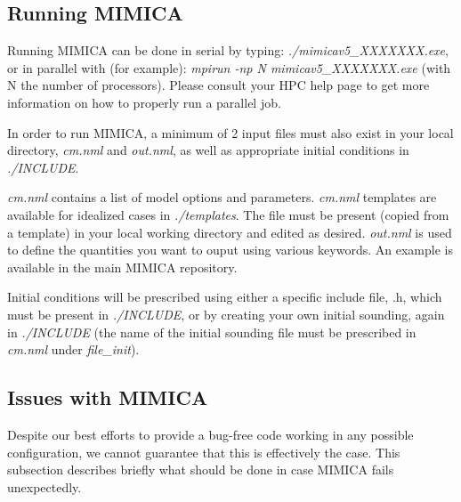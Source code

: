 \documentclass[12pt,A4,french]{article}
\begin{document}
 \subsection{Running MIMICA}

Running MIMICA can be done in serial by typing: {\it ./mimicav5\_XXXXXXX.exe}, or in parallel with (for example): {\it mpirun -np N mimicav5\_XXXXXXX.exe} (with N the number of processors). Please consult your HPC help page to get more information on how to properly run a parallel job.

In order to run MIMICA, a minimum of 2 input files must also exist in your local directory, {\it cm.nml} and {\it out.nml}, as well as appropriate initial conditions in {\it ./INCLUDE}.

{\it cm.nml} contains a list of model options and parameters. {\it cm.nml} templates are available for idealized cases in {\it ./templates}. The file must be present (copied from a template) in your local working directory and edited as desired. {\it out.nml} is used to define the quantities you want to ouput using various keywords. An example is available in the main MIMICA repository.

Initial conditions will be prescribed using either a specific include file, .h, which must be present in {\it ./INCLUDE}, or by creating your own initial sounding, again in {\it ./INCLUDE} (the name of the initial sounding file must be prescribed in {\it cm.nml} under {\it file\_init}).

\subsection{Issues with MIMICA}

Despite our best efforts to provide a bug-free code working in any possible configuration, we cannot guarantee that this is effectively the case. This subsection describes briefly what should be done in case MIMICA fails unexpectedly.
\end{document}
